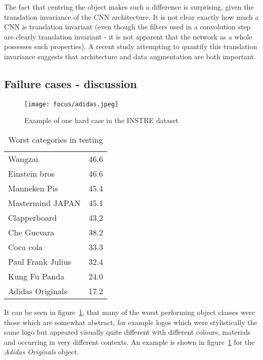 The fact that centring the object makes such a difference is surprising, given the translation invariance of the CNN architecture. It is not clear exactly how much a CNN is translation invariant (even though the filters used in a convolution step are clearly translation invariant - it is not apparent that the network as a whole possesses such properties). A recent study attempting to quantify this translation invariance \cite{EricKauderer-Abrams2016} suggests that architecture and data augmentation are both important. 


\subsection {Failure cases - discussion}


\begin{figure}[t]
    \caption{Example of one hard case in the INSTRE dataset}
\centering
\texttt{[image: focus/adidas.jpeg]}
\label{fig:focus_adidas}
\end{figure}



\begin{table}[h]
\centering
\caption{Worst categories in testing }
\begin{tabular}{ l l }
  \toprule 
  Wangzai & 46.6 \\
  Einstein bros & 46.6\\
  Manneken Pis & 45.4\\
  Mastermind JAPAN & 45.1\\
  Clapperboard & 43.2\\
  Che Guevara & 38.2\\
  Coca cola & 33.3\\
  Paul Frank Julius & 32.4\\
  Kung Fu Panda & 24.0\\
  Adidas Originals & 17.2\\
  \bottomrule
\end{tabular}
\label{fig:focus_failure}
\end{table}

It can be seen in figure~\ref{fig:focus_failure}, that many of the worst performing object classes were those which are somewhat abstract, for example logos which were stylistically the same logo but appeared visually quite different with different colours, materials and occurring in very different contexts. An example is shown in figure~\ref{fig:focus_adidas} for the \emph{Adidas Originals} object.


